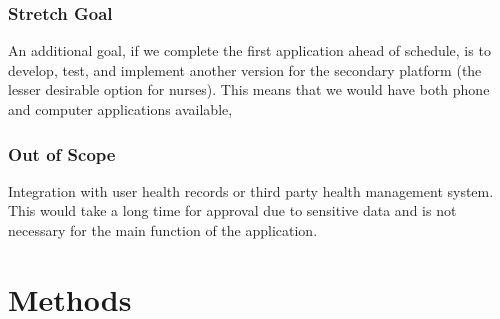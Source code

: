 \documentclass[onecolumn, draftclsnofoot,10pt, compsoc]{IEEEtran}
\begin{document}
\subsubsection{Stretch Goal}
An additional goal, if we complete the first application ahead of schedule, is to develop, test, and implement another version for the secondary platform (the lesser desirable option for nurses). This means that we would have both phone and computer applications available,
\subsubsection{Out of Scope}
Integration with user health records or third party health management system. This would take a long time for approval due to sensitive data and is not necessary for the main function of the application.
\section{Methods}

\end{document}
